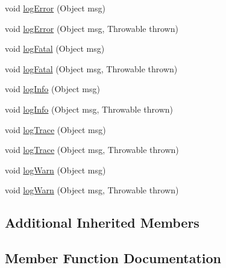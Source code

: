\begin{DoxyCompactItemize}
\item 
void \mbox{\hyperlink{classcom_1_1mysql_1_1cj_1_1log_1_1_slf4_j_logger_a1a99e9a4f586e0678a68d1145cd26bc5}{log\+Error}} (Object msg)
\item 
void \mbox{\hyperlink{classcom_1_1mysql_1_1cj_1_1log_1_1_slf4_j_logger_a30a623739677aa264670ff888fff2958}{log\+Error}} (Object msg, Throwable thrown)
\item 
void \mbox{\hyperlink{classcom_1_1mysql_1_1cj_1_1log_1_1_slf4_j_logger_a60d9438bd9dfae5451a25543e2d4584a}{log\+Fatal}} (Object msg)
\item 
void \mbox{\hyperlink{classcom_1_1mysql_1_1cj_1_1log_1_1_slf4_j_logger_ac61e11ed170d64dec00903990ac86778}{log\+Fatal}} (Object msg, Throwable thrown)
\item 
void \mbox{\hyperlink{classcom_1_1mysql_1_1cj_1_1log_1_1_slf4_j_logger_a3444f6e7cb48a80d3cf82acf93a74c27}{log\+Info}} (Object msg)
\item 
void \mbox{\hyperlink{classcom_1_1mysql_1_1cj_1_1log_1_1_slf4_j_logger_ad6eaf1dfaaa8f7f4c7a092852a4add0f}{log\+Info}} (Object msg, Throwable thrown)
\item 
void \mbox{\hyperlink{classcom_1_1mysql_1_1cj_1_1log_1_1_slf4_j_logger_aa2d6ea6567c9c148b7170d771686386b}{log\+Trace}} (Object msg)
\item 
void \mbox{\hyperlink{classcom_1_1mysql_1_1cj_1_1log_1_1_slf4_j_logger_aa93d48c2e1172db2949b2ac64e58052a}{log\+Trace}} (Object msg, Throwable thrown)
\item 
void \mbox{\hyperlink{classcom_1_1mysql_1_1cj_1_1log_1_1_slf4_j_logger_a9b6bd04f7179ae6e572fb9ac91ade49e}{log\+Warn}} (Object msg)
\item 
void \mbox{\hyperlink{classcom_1_1mysql_1_1cj_1_1log_1_1_slf4_j_logger_a617f07e2c9b52bc774d8e8ea83ace092}{log\+Warn}} (Object msg, Throwable thrown)
\end{DoxyCompactItemize}
\subsection*{Additional Inherited Members}


\subsection{Member Function Documentation}
\mbox{\label{classcom_1_1mysql_1_1cj_1_1log_1_1_slf4_j_logger_a2063aafb5440a0a1a8b9038603916773}} 
